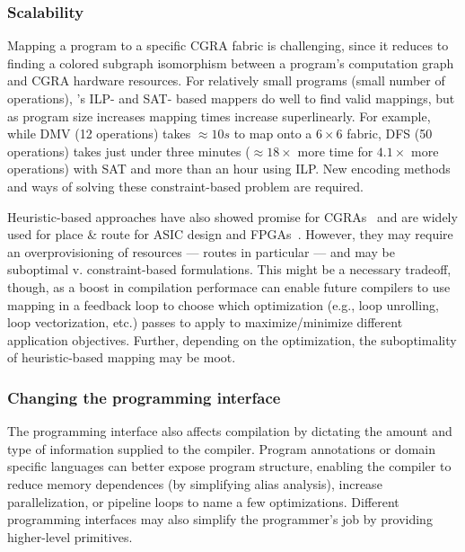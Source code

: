 \subsubsection{Scalability}
Mapping a program to a specific CGRA fabric is challenging, since it reduces to finding a colored subgraph isomorphism between a program's computation graph and CGRA hardware resources.
% 
For relatively small programs (small number of operations), \riptide's ILP- and SAT- based mappers do well to find valid mappings, but as program size increases mapping times increase superlinearly.
% 
For example, while DMV (12 operations) takes $\approx10s$ to map onto a $6\times6$ fabric, DFS (50 operations) takes just under three minutes ($\approx 18\times$ more time for $4.1\times$ more operations) with SAT and more than an hour using ILP.
% 
New encoding methods and ways of solving these constraint-based problem are required.
% 
% 
% 

Heuristic-based approaches have also showed promise for CGRAs~\cite{himap,lee2021ultra,4dcgra,amp2020,chordmap,pathseeker} and are widely used for place \& route for ASIC design and FPGAs~\cite{chen2006fpga}.
% 
However, they may require an overprovisioning of resources --- routes in particular --- and may be suboptimal v. constraint-based formulations.
%
% 
This might be a necessary tradeoff, though, as a boost in compilation performace can enable future compilers to use mapping in a feedback loop to choose which optimization (e.g., loop unrolling, loop vectorization, etc.) passes to apply to maximize/minimize different application objectives.
% 
Further, depending on the optimization, the suboptimality of heuristic-based mapping may be moot.

\subsubsection{Changing the programming interface}
The programming interface also affects compilation by dictating the amount and type of information supplied to the compiler.
% 
Program annotations or domain specific languages can better expose program structure, enabling the compiler to reduce memory dependences (by simplifying alias analysis), increase parallelization, or pipeline loops to name a few optimizations. 
% 
Different programming interfaces may also simplify the programmer's job by providing higher-level primitives.

